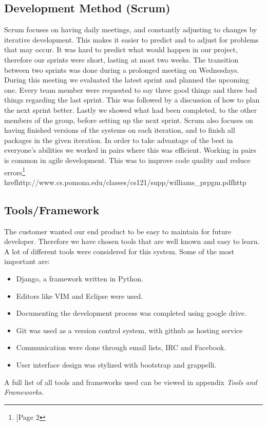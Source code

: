 \subsection{Development Method (Scrum)}
Scrum focuses on having daily meetings, and constantly adjusting to
changes by iterative development. This makes it easier to predict and
to adjust for problems that may occur. It was hard to predict what
would happen in our project, therefore our sprints were short, lasting
at most two weeks. The transition between two sprints was done during a
prolonged meeting on Wednesdays. During this meeting we evaluated the
latest sprint and planned the upcoming one. Every team member were
requested to say three good things and three bad things regarding the
last sprint. This was followed by a discussion of how to plan the next
sprint better. Lastly we showed what had been completed, to the other
members of the group, before setting up the next sprint. Scrum also
focuses on having finished versions of the systems on each iteration,
and to finish all packages in the given iteration.
In order to take advantage of the best in everyone's
abilities we worked in pairs where this was efficient. Working in pairs
is common in agile development. This was to improve code quality and
reduce errors\footnote{[Page 2}
href{http://www.cs.pomona.edu/classes/cs121/supp/williams\_prpgm.pdf}{http}

\subsection{Tools/Framework}
The customer wanted our end product to be easy to maintain for future
developer. Therefore we have chosen tools that are well known and easy
to learn. A lot of different tools were considered for this system. Some of the
most important are:

\begin{itemize}
    \item Django, a framework written in Python.
    \item Editors like VIM and Eclipse were used. 
    \item Documenting the development process was completed using google drive.
    \item Git was used as a version control system, with github as hosting
        service
    \item Communication were done through email lists, IRC and Facebook. 
    \item User interface design was stylized with bootstrap and grappelli. 
\end{itemize}
A full list of all tools and frameworks used can be viewed in appendix
\textit{Tools and Frameworks.}

